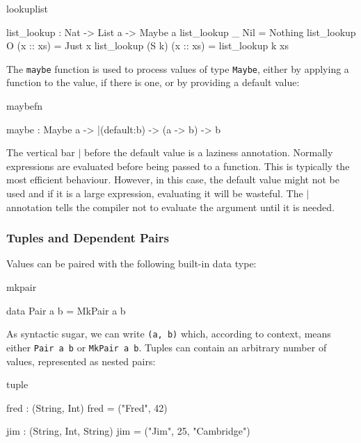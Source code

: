 \begin{SaveVerbatim}{lookuplist}

list_lookup : Nat -> List a -> Maybe a
list_lookup _     Nil       = Nothing
list_lookup O     (x :: xs) = Just x
list_lookup (S k) (x :: xs) = list_lookup k xs

\end{SaveVerbatim}

\noindent
The \texttt{maybe} function is used to process values of type \texttt{Maybe}, 
either by applying a function to the value, if there is one, or by providing a default value:

\begin{SaveVerbatim}{maybefn}

maybe : Maybe a -> |(default:b) -> (a -> b) -> b

\end{SaveVerbatim}

\noindent
The vertical bar $\mid$ before the default value is a laziness annotation. Normally
expressions are evaluated before being passed to a function. This is typically
the most efficient behaviour. However, in this case, the default value might
not be used and if it is a large expression, evaluating it will be wasteful.
The $\mid$ annotation tells the compiler not to evaluate the argument until it is
needed.

\subsubsection{Tuples and Dependent Pairs}

Values can be paired with the following built-in data type:

\begin{SaveVerbatim}{mkpair}

data Pair a b = MkPair a b

\end{SaveVerbatim}

\noindent
As syntactic sugar, we can write \texttt{(a, b)} which, according to context,
means either \texttt{Pair a b} or \texttt{MkPair a b}.
Tuples can contain an arbitrary number of values, represented as nested pairs:

\begin{SaveVerbatim}{tuple}

fred : (String, Int)
fred = ("Fred", 42)

jim : (String, Int, String)
jim = ("Jim", 25, "Cambridge")

\end{SaveVerbatim}

